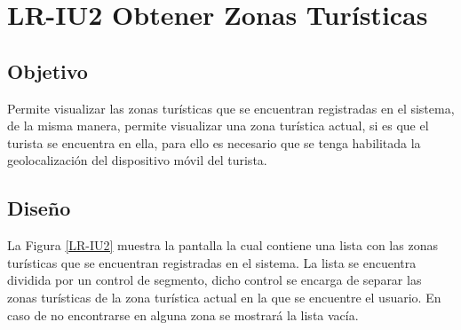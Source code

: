 \newpage
\section{LR-IU2 Obtener Zonas Turísticas}

\subsection{Objetivo}
Permite visualizar las zonas turísticas que se encuentran registradas en el sistema, de la misma manera, permite visualizar una zona turística actual, si es que el turista se encuentra en ella, para ello es necesario que se tenga habilitada la geolocalización del dispositivo móvil del turista.

\subsection{Diseño}
La Figura \ref{LR-IU2} muestra la pantalla  la cual contiene una lista con las zonas turísticas que se encuentran registradas en el sistema. La lista se encuentra dividida por un control de segmento, dicho control se encarga de separar las zonas turísticas de la zona turística actual en la que se encuentre el usuario. En caso de no encontrarse en alguna zona se mostrará la lista vacía.



